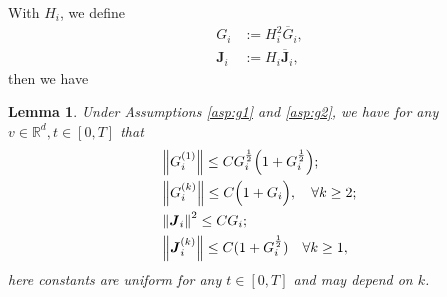 \documentclass[a4paper, 11pt]{article}
\newcounter{results}[section]
\theoremstyle{plain}
\newtheorem{lemma}[results]{Lemma}
\theoremstyle{remark}
\theoremstyle{definition}
\newcommand{\J}{\boldsymbol{J}}
\begin{document}
		
		With $H_i$, we define
		\begin{eqnarray}
			G_i&:=H^2_i\overline{G}_i,\\
			\J_i&:=H_i\overline{\J}_i,
		\end{eqnarray}
		then we have 
		\begin{lemma}\label{lem:g4}Under Assumptions \ref{asp:g1} and \ref{asp:g2}, we have for any $v\in\mathbb{R}^d,t\in [0,T]$ that
			\begin{eqnarray}
				&\norm{{G}_i^{(1)}}\leq C{G}^{\frac{1}{2}}_i\Big(1+{G}^{\frac{1}{2}}_i\Big);\\
				&\norm{{G}_i^{(k)}}\leq C\Big(1+{{G}_i}\Big),\quad \forall k\geq 2;\\
				&\norm{{\J}_i}^2\leq C{G}_i;\\
				&\norm{{\J}_i^{(k)}}\leq C(1+{G}^{\frac{1}{2}}_i)\quad \forall k\geq 1,
			\end{eqnarray}
            here constants are uniform for any $t\in [0,T]$ and may depend on $k$.
		\end{lemma}
\end{document}
